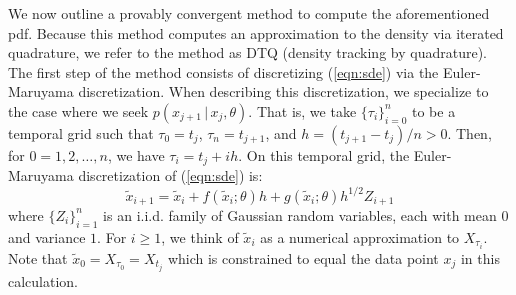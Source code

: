 \documentclass[wcp]{jmlr}
\begin{document}
We now outline a provably convergent method to compute the aforementioned
pdf.  Because this method computes an approximation to the density via
iterated quadrature, we refer to the method as DTQ (density tracking
by quadrature).  The first step of the method consists of discretizing
(\ref{eqn:sde}) via the Euler-Maruyama discretization.  When
describing this discretization, we specialize to the case where we
seek $p(x_{j+1} \, | \, x_j, \theta)$.  That is, we take
$\{\tau_i\}_{i=0}^n$ to be a temporal grid such that $\tau_0 = t_j$,
$\tau_n = t_{j+1}$, and $h = (t_{j+1} - t_j)/n > 0$.  Then, for $0 =
1, 2, \ldots, n$, we have $\tau_i = t_j + i h$.  On this temporal
grid, the Euler-Maruyama discretization of (\ref{eqn:sde}) is:
\begin{equation}
\label{eqn:sde_em}
\tilde{x}_{i+1} = \tilde{x}_i + f(\tilde{x}_i; \theta) h +
g(\tilde{x}_i; \theta) h^{1/2} Z_{i+1}
\end{equation}
where $\{Z_i\}_{i=1}^{n}$ is an i.i.d. family of Gaussian random
variables, each with mean $0$ and variance $1$.  For $i \geq 1$, we
think of $\tilde{x}_i$ as a numerical approximation to $X_{\tau_i}$.
Note that $\tilde{x}_0 = X_{\tau_0} = X_{t_j}$ which is constrained to
equal the data point $x_j$ in this calculation.
\end{document}
